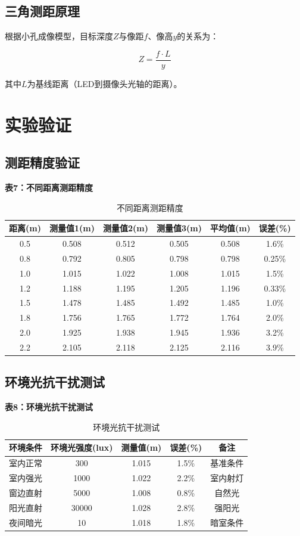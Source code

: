 \documentclass[12pt, a4paper]{ctexart}
\begin{document}
\subsection{三角测距原理}

根据小孔成像模型，目标深度$Z$与像距$f$、像高$y$的关系为：

$$Z = \frac{f \cdot L}{y}$$

其中$L$为基线距离（LED到摄像头光轴的距离）。

\section{实验验证}

\subsection{测距精度验证}

\textbf{表7：不同距离测距精度}

\begin{table}[htbp]
\centering
\caption{不同距离测距精度}
\begin{tabular}{cccccc}
\toprule
距离(m) & 测量值1(m) & 测量值2(m) & 测量值3(m) & 平均值(m) & 误差(\%) \\
\midrule
0.5 & 0.508 & 0.512 & 0.505 & 0.508 & 1.6\% \\
0.8 & 0.792 & 0.805 & 0.798 & 0.798 & 0.25\% \\
1.0 & 1.015 & 1.022 & 1.008 & 1.015 & 1.5\% \\
1.2 & 1.188 & 1.195 & 1.205 & 1.196 & 0.33\% \\
1.5 & 1.478 & 1.485 & 1.492 & 1.485 & 1.0\% \\
1.8 & 1.756 & 1.765 & 1.772 & 1.764 & 2.0\% \\
2.0 & 1.925 & 1.938 & 1.945 & 1.936 & 3.2\% \\
2.2 & 2.105 & 2.118 & 2.125 & 2.116 & 3.9\% \\
\bottomrule
\end{tabular}
\end{table}

\subsection{环境光抗干扰测试}

\textbf{表8：环境光抗干扰测试}

\begin{table}[htbp]
\centering
\caption{环境光抗干扰测试}
\begin{tabular}{ccccc}
\toprule
环境条件 & 环境光强度(lux) & 测量值(m) & 误差(\%) & 备注 \\
\midrule
室内正常 & 300 & 1.015 & 1.5\% & 基准条件 \\
室内强光 & 1000 & 1.022 & 2.2\% & 室内射灯 \\
窗边直射 & 5000 & 1.008 & 0.8\% & 自然光 \\
阳光直射 & 30000 & 1.028 & 2.8\% & 强阳光 \\
夜间暗光 & 10 & 1.018 & 1.8\% & 暗室条件 \\
\bottomrule
\end{tabular}
\end{table}
\end{document}
